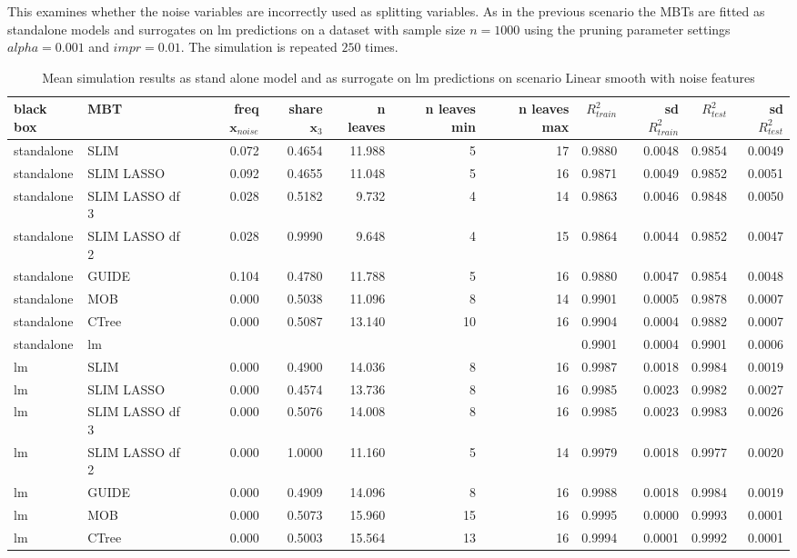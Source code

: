 This examines whether the noise variables are incorrectly used as splitting variables.
As in the previous scenario the MBTs are fitted as standalone models and surrogates on lm predictions on a dataset with sample size $ n = 1000$ using the pruning parameter settings $alpha = 0.001$ and $impr = 0.01$. The simulation is repeated $250$ times.

\begin{table}[!htb]
\caption{Mean simulation results as stand alone model and as surrogate on lm predictions on scenario Linear smooth with noise features}
\centering \tiny
\begin{tabular}[t]{l|l|r|r|r|r|r|r|r|r|r}
\hline
black box & MBT & freq $ \textbf{x}_{noise}$  & share $\textbf{x}_3$ & n leaves & n leaves min & n leaves max & $R^2_{train}$  & sd $R^2_{train}$ & $R^2_{test}$ & sd $R^2_{test}$\\
\hline
standalone & SLIM & 0.072 & 0.4654 & 11.988 & 5 & 17 & 0.9880 & 0.0048 & 0.9854 & 0.0049\\
standalone & SLIM LASSO & 0.092 & 0.4655 & 11.048 & 5 & 16 & 0.9871 & 0.0049 & 0.9852 & 0.0051\\
standalone & SLIM LASSO df 3 & 0.028 & 0.5182 & 9.732 & 4 & 14 & 0.9863 & 0.0046 & 0.9848 & 0.0050\\
standalone & SLIM LASSO df 2 & 0.028 & 0.9990 & 9.648 & 4 & 15 & 0.9864 & 0.0044 & 0.9852 & 0.0047\\
standalone & GUIDE & 0.104 & 0.4780 & 11.788 & 5 & 16 & 0.9880 & 0.0047 & 0.9854 & 0.0048\\
standalone & MOB & 0.000 & 0.5038 & 11.096 & 8 & 14 & 0.9901 & 0.0005 & 0.9878 & 0.0007\\
standalone & CTree & 0.000 & 0.5087 & 13.140 & 10 & 16 & 0.9904 & 0.0004 & 0.9882 & 0.0007\\
\hline

standalone & lm & & & & & & 0.9901 & 0.0004 & 0.9901 & 0.0006\\

\hline
lm & SLIM & 0.000 & 0.4900 & 14.036 & 8 & 16 & 0.9987 & 0.0018 & 0.9984 & 0.0019\\
lm & SLIM LASSO & 0.000 & 0.4574 & 13.736 & 8 & 16 & 0.9985 & 0.0023 & 0.9982 & 0.0027\\
lm & SLIM LASSO df 3 & 0.000 & 0.5076 & 14.008 & 8 & 16 & 0.9985 & 0.0023 & 0.9983 & 0.0026\\
lm & SLIM LASSO df 2 & 0.000 & 1.0000 & 11.160 & 5 & 14 & 0.9979 & 0.0018 & 0.9977 & 0.0020\\
lm & GUIDE & 0.000 & 0.4909 & 14.096 & 8 & 16 & 0.9988 & 0.0018 & 0.9984 & 0.0019\\
lm & MOB & 0.000 & 0.5073 & 15.960 & 15 & 16 & 0.9995 & 0.0000 & 0.9993 & 0.0001\\
lm & CTree & 0.000 & 0.5003 & 15.564 & 13 & 16 & 0.9994 & 0.0001 & 0.9992 & 0.0001\\
\hline
\end{tabular}
\label{tab:linear_smooth_noisy_summary}
\end{table}

